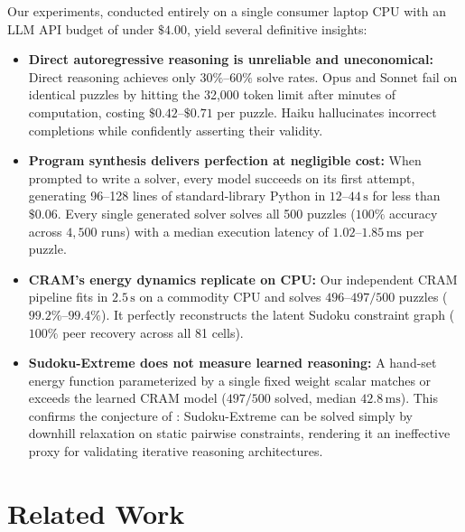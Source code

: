 \documentclass{article} %
\begin{document}
Our experiments, conducted entirely on a single consumer laptop CPU with an LLM API budget of under $\$4.00$, yield several definitive insights:
\begin{itemize}
    \item \textbf{Direct autoregressive reasoning is unreliable and uneconomical:} Direct reasoning achieves only $30\%\text{--}60\%$ solve rates. Opus and Sonnet fail on identical puzzles by hitting the 32,000 token limit after minutes of computation, costing $\$0.42\text{--}\$0.71$ per puzzle. Haiku hallucinates incorrect completions while confidently asserting their validity.
    \item \textbf{Program synthesis delivers perfection at negligible cost:} When prompted to write a solver, every model succeeds on its first attempt, generating 96--128 lines of standard-library Python in $12\text{--}44\,\mathrm{s}$ for less than $\$0.06$. Every single generated solver solves all 500 puzzles ($100\%$ accuracy across $4{,}500$ runs) with a median execution latency of $1.02\text{--}1.85\,\mathrm{ms}$ per puzzle.
    \item \textbf{CRAM's energy dynamics replicate on CPU:} Our independent CRAM pipeline fits in $2.5\,\mathrm{s}$ on a commodity CPU and solves $496\text{--}497/500$ puzzles ($99.2\%\text{--}99.4\%$). It perfectly reconstructs the latent Sudoku constraint graph ($100\%$ peer recovery across all 81 cells).
    \item \textbf{Sudoku-Extreme does not measure learned reasoning:} A hand-set energy function parameterized by a single fixed weight scalar matches or exceeds the learned CRAM model ($497/500$ solved, median $42.8\,\mathrm{ms}$). This confirms the conjecture of \citet{hoover2026cram}: Sudoku-Extreme can be solved simply by downhill relaxation on static pairwise constraints, rendering it an ineffective proxy for validating iterative reasoning architectures.
\end{itemize}

\section{Related Work}
\label{sec:related_work}
\end{document}

